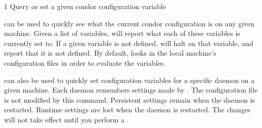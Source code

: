 \begin{ManPage}{\label{man-condor-config-val}}{1}
{Query or set a given condor configuration variable}
\Synopsis {}








\Description

 can be used to quickly see what the current
condor configuration is on any given machine.  Given a list of
variables,  will report what each of these
variables is currently set to.  If a given variable is not defined,
 will halt on that variable, and report that it is
not defined.  By default,  looks in the local
machine's configuration files in order to evaluate the variables.

 can also be used to quickly set configuration
variables for a specific daemon on a given machine.  Each daemon
remembers settings made by .  The configuration
file is not modified by this command.  Persistent settings remain when
the daemon is restarted.  Runtime settings are lost when the daemon is
restarted.  \Note The changes will not take effect until you perform a
.


\end{ManPage}
